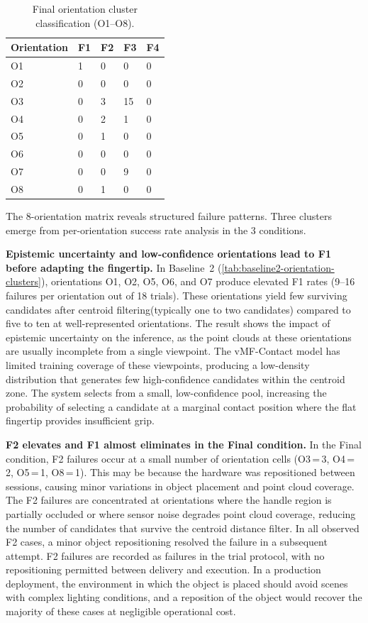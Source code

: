 \documentclass[oneside,studentpaper]{wbk}
\begin{document}
\begin{table}[htbp]
  \centering
  \caption{Final orientation cluster classification (O1--O8).}
  \label{tab:final-orientation-clusters}
  \begin{tabular}{lllll}
    \toprule
    Orientation & F1 & F2 & F3 & F4 \\
    \midrule
    O1 & 1 & 0 &  0 & 0 \\
    O2 & 0 & 0 &  0 & 0 \\
    O3 & 0 & 3 & 15 & 0 \\
    O4 & 0 & 2 &  1 & 0 \\
    O5 & 0 & 1 &  0 & 0 \\
    O6 & 0 & 0 &  0 & 0 \\
    O7 & 0 & 0 &  9 & 0 \\
    O8 & 0 & 1 &  0 & 0 \\
    \bottomrule
  \end{tabular}
\end{table}

The 8-orientation matrix reveals structured failure patterns. Three clusters emerge from per-orientation success rate analysis in the 3 conditions.

\textbf{Epistemic uncertainty and low-confidence orientations lead to F1 before adapting the fingertip.} In Baseline~2 (\cref{tab:baseline2-orientation-clusters}), orientations O1, O2, O5, O6, and O7 produce elevated F1 rates (9--16 failures per orientation out of 18 trials). These orientations yield few surviving candidates after centroid filtering(typically one to two candidates) compared to five to ten at well-represented orientations. The result shows the impact of epistemic uncertainty on the inference, as the point clouds at these orientations are usually incomplete from a single viewpoint. The vMF-Contact model has limited training coverage of these viewpoints, producing a low-density distribution that generates few high-confidence candidates within the centroid zone. The system selects from a small, low-confidence pool, increasing the probability of selecting a candidate at a marginal contact position where the flat fingertip provides insufficient grip.

\textbf{F2 elevates and F1 almost eliminates in the Final condition.} In the Final condition, F2 failures occur at a small number of orientation cells (O3\,=\,3, O4\,=\,2, O5\,=\,1, O8\,=\,1). This may be because the hardware was repositioned between sessions, causing minor variations in object placement and point cloud coverage. The F2 failures are concentrated at orientations where the handle region is partially occluded or where sensor noise degrades point cloud coverage, reducing the number of candidates that survive the centroid distance filter. In all observed F2 cases, a minor object repositioning resolved the failure in a subsequent attempt. F2 failures are recorded as failures in the trial protocol, with no repositioning permitted between delivery and execution. In a production deployment, the environment in which the object is placed should avoid scenes with complex lighting conditions, and a reposition of the object would recover the majority of these cases at negligible operational cost.
\end{document}
